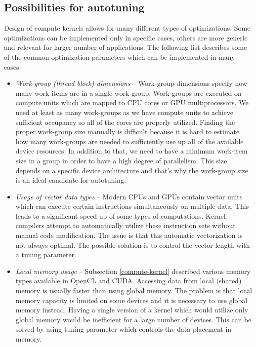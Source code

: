 \documentclass[
  digital,     %
  oneside,     %
  nosansbold,  %
  nocolorbold, %
  lof,         %
  lot,         %
  nocover
]{fithesis4}
\begin{document}
\subsection{Possibilities for autotuning}
Design of compute kernels allows for many different types of optimizations. Some optimizations can be implemented only in specific cases, others are more generic and relevant for larger number of applications. The following list describes some of the common optimization parameters which can be implemented in many cases:

\begin{itemize}
	\item \textit{Work-group (thread block) dimensions} -- Work-group dimensions specify how many work-items are in a single work-group. Work-groups are executed on compute units which are mapped to CPU cores or GPU multiprocessors. We need at least as many work-groups as we have compute units to achieve sufficient occupancy so all of the cores are properly utilized. Finding the proper work-group size manually is difficult because it is hard to estimate how many work-groups are needed to sufficiently use up all of the available device resources. In addition to that, we need to have a minimum work-item size in a group in order to have a high degree of parallelism. This size depends on a specific device architecture and that's why the work-group size is an ideal candidate for autotuning.
	\item \textit{Usage of vector data types} -- Modern CPUs and GPUs contain vector units which can execute certain instructions simultaneously on multiple data. This leads to a significant speed-up of some types of computations. Kernel compilers attempt to automatically utilize these instruction sets without manual code modification. The issue is that this automatic vectorization is not always optimal. The possible solution is to control the vector length with a tuning parameter.
	\item \textit{Local memory usage} -- Subsection \ref{compute-kernel} described various memory types available in OpenCL and CUDA. Accessing data from local (shared) memory is usually faster than using global memory. The problem is that local memory capacity is limited on some devices and it is necessary to use global memory instead. Having a single version of a kernel which would utilize only global memory would be inefficient for a large number of devices. This can be solved by using tuning parameter which controls the data placement in memory.
\end{itemize}
\end{document}
